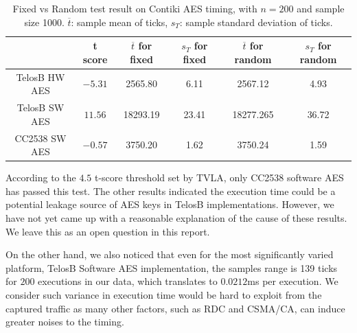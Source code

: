 \begin{table}[ht!]
	\centering
	\begin{tabular}{|c|c|c|c|c|c|}
		\hline
		              & t score           & $\overline{t}$ for fixed & $s_{T}$ for fixed & $\overline{t}$ for random & $s_{T}$ for random\\ \hline
		TelosB HW AES & $-5.31 $ & 2565.80     & 6.11      & 2567.12      & 4.93       \\ \hline
		TelosB SW AES & $11.56$ & 18293.19    & 23.41     & 18277.265   & 36.72      \\ \hline
		CC2538 SW AES & $-0.57$ & 3750.20    & 1.62      & 3750.24     & 1.59       \\ \hline
	\end{tabular}
	\caption{Fixed vs Random test result on Contiki AES timing, with $n=200$ and sample size 1000. $\overline{t}$: sample mean of ticks, $s_{T}$: sample standard deviation of ticks.}
	\label{Tbl: Fixed vs Random test on Contiki AES timing}
\end{table}

According to the $4.5$ t-score threshold set by TVLA, only CC2538 software AES has passed this test. The other results indicated the execution time could be a potential leakage source of AES keys in TelosB implementations. However, we have not yet came up with a reasonable explanation of the cause of these results. We leave this as an open question in this report.

On the other hand, we also noticed that even for the most significantly varied platform, TelosB Software AES implementation, the samples range is 139 ticks for $200$ executions in our data, which translates to $0.0212$ms per execution. We consider such variance in execution time would be hard to exploit from the captured traffic as many other factors, such as  RDC and CSMA/CA, can induce greater noises to the timing.


